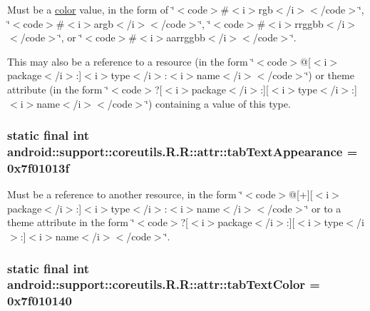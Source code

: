 Must be a \hyperlink{classandroid_1_1support_1_1coreutils_1_1_r_1_1color}{color} value, in the form of \char`\"{}$<$code$>$\#$<$i$>$rgb$<$/i$>$$<$/code$>$\char`\"{}, \char`\"{}$<$code$>$\#$<$i$>$argb$<$/i$>$$<$/code$>$\char`\"{}, \char`\"{}$<$code$>$\#$<$i$>$rrggbb$<$/i$>$$<$/code$>$\char`\"{}, or \char`\"{}$<$code$>$\#$<$i$>$aarrggbb$<$/i$>$$<$/code$>$\char`\"{}. 

This may also be a reference to a resource (in the form \char`\"{}$<$code$>$@\mbox{[}$<$i$>$package$<$/i$>$:\mbox{]}$<$i$>$type$<$/i$>$:$<$i$>$name$<$/i$>$$<$/code$>$\char`\"{}) or theme attribute (in the form \char`\"{}$<$code$>$?\mbox{[}$<$i$>$package$<$/i$>$:\mbox{]}\mbox{[}$<$i$>$type$<$/i$>$:\mbox{]}$<$i$>$name$<$/i$>$$<$/code$>$\char`\"{}) containing a value of this type. \hypertarget{classandroid_1_1support_1_1coreutils_1_1_r_1_1attr_c15cf96834741bc42b41baaee0ecf40f}{
\subsubsection[{tabTextAppearance}]{\setlength{\rightskip}{0pt plus 5cm}static final int android::support::coreutils.R.R::attr::tabTextAppearance = 0x7f01013f}}
\label{classandroid_1_1support_1_1coreutils_1_1_r_1_1attr_c15cf96834741bc42b41baaee0ecf40f}


Must be a reference to another resource, in the form \char`\"{}$<$code$>$@\mbox{[}+\mbox{]}\mbox{[}$<$i$>$package$<$/i$>$:\mbox{]}$<$i$>$type$<$/i$>$:$<$i$>$name$<$/i$>$$<$/code$>$\char`\"{} or to a theme attribute in the form \char`\"{}$<$code$>$?\mbox{[}$<$i$>$package$<$/i$>$:\mbox{]}\mbox{[}$<$i$>$type$<$/i$>$:\mbox{]}$<$i$>$name$<$/i$>$$<$/code$>$\char`\"{}. \hypertarget{classandroid_1_1support_1_1coreutils_1_1_r_1_1attr_e9d3c152066389e8ec541049ad937762}{
\subsubsection[{tabTextColor}]{\setlength{\rightskip}{0pt plus 5cm}static final int android::support::coreutils.R.R::attr::tabTextColor = 0x7f010140}}
\label{classandroid_1_1support_1_1coreutils_1_1_r_1_1attr_e9d3c152066389e8ec541049ad937762}


